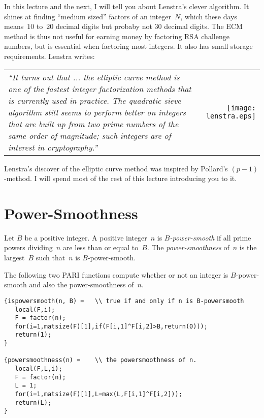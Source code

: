 \documentclass[11pt]{report}
\begin{document}
In this lecture and the next, I will tell you about Lenstra's clever
algorithm.  It shines at finding ``medium sized'' factors of an
integer~$N$, which these days means~$10$ to~$20$ decimal digits but
probaby not $30$ decimal digits.  The ECM method is thus not useful
for earning money by factoring RSA challenge numbers, but is
essential when factoring most integers.  It also has small storage
requirements.   Lenstra writes:\vspace{1ex}

\begin{tabular}{lr}
  \begin{minipage}{.6\textwidth}
    {\sl ``It turns out that ... the elliptic curve method is one
      of the fastest integer factorization methods that is currently
      used in practice.  The quadratic sieve algorithm still seems
      to perform better on integers that are built up from two prime
      numbers of the same order of magnitude; such integers are of interest
      in cryptography.''}
  \end{minipage}\hspace{.5in}
   &
  \begin{minipage}{1.5in}
    \texttt{[image: lenstra.eps]}
  \end{minipage}
\end{tabular}


Lenstra's discover of the elliptic curve method was inspired by
Pollard's $(p-1)$-method.  I will spend most of the rest
of this lecture introducing you to it.

\section{Power-Smoothness}
\begin{definition}
  Let $B$ be a positive integer.  A positive integer~$n$ is
    {\em $B$-power-smooth} if all prime powers dividing~$n$ are
  less than or equal to~$B$.  The {\em power-smoothness} of~$n$ is
  the largest~$B$ such that~$n$ is $B$-power-smooth.
\end{definition}

The following two PARI functions compute whether or not an
integer is $B$-power-smooth and also the power-smoothness of~$n$.
\begin{verbatim}
{ispowersmooth(n, B) =   \\ true if and only if n is B-powersmooth
   local(F,i);
   F = factor(n);
   for(i=1,matsize(F)[1],if(F[i,1]^F[i,2]>B,return(0)));
   return(1);
}

{powersmoothness(n) =    \\ the powersmoothness of n.
   local(F,L,i);
   F = factor(n);
   L = 1;
   for(i=1,matsize(F)[1],L=max(L,F[i,1]^F[i,2]));
   return(L);
}
\end{verbatim}
\end{document}

